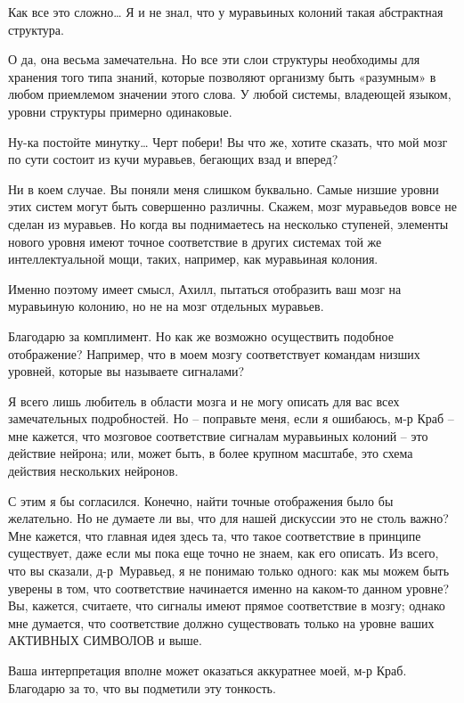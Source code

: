 \documentclass[../main.tex]{subfiles}
\begin{document}
\begin{dialogue}
 Как все это сложно\ldots{} Я и не знал, что у муравьиных колоний такая абстрактная структура.

 О да, она весьма замечательна. Но все эти слои структуры необходимы для хранения того типа знаний, которые позволяют организму быть «разумным» в любом приемлемом значении этого слова. У любой системы, владеющей языком, уровни структуры примерно одинаковые.

 Ну-ка постойте минутку\ldots{} Черт побери! Вы что же, хотите сказать, что мой мозг по сути состоит из кучи муравьев, бегающих взад и вперед?

 Ни в коем случае. Вы поняли меня слишком буквально. Самые низшие уровни этих систем могут быть совершенно различны. Скажем, мозг муравьедов вовсе не сделан из муравьев. Но когда вы поднимаетесь на несколько ступеней, элементы нового уровня имеют точное соответствие в других системах той же интеллектуальной мощи, таких, например, как муравьиная колония.

 Именно поэтому имеет смысл, Ахилл, пытаться отобразить ваш мозг на муравьиную колонию, но не на мозг отдельных муравьев.

 Благодарю за комплимент. Но как же возможно осуществить подобное отображение? Например, что в моем мозгу соответствует командам низших уровней, которые вы называете сигналами?

 Я всего лишь любитель в области мозга и не могу описать для вас всех замечательных подробностей. Но \--- поправьте меня, если я ошибаюсь, м-р Краб \--- мне кажется, что мозговое соответствие сигналам муравьиных колоний \--- это действие нейрона; или, может быть, в более крупном масштабе, это схема действия нескольких нейронов.

 С этим я бы согласился. Конечно, найти точные отображения было бы желательно. Но не думаете ли вы, что для нашей дискуссии это не столь важно? Мне кажется, что главная идея здесь та, что такое соответствие в принципе существует, даже если мы пока еще точно не знаем, как его описать. Из всего, что вы сказали, д-р~Муравьед, я не понимаю только одного: как мы можем быть уверены в том, что соответствие начинается именно на каком-то данном уровне? Вы, кажется, считаете, что сигналы имеют прямое соответствие в мозгу; однако мне думается, что соответствие должно существовать только на уровне ваших АКТИВНЫХ СИМВОЛОВ и выше.

 Ваша интерпретация вполне может оказаться аккуратнее моей, м-р Краб. Благодарю за то, что вы подметили эту тонкость.


\end{dialogue}
\end{document}
